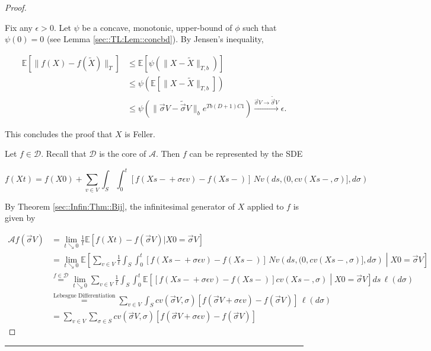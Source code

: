 \documentclass[12pt]{article}
\newcommand{\mb}{\mathbb}
\newcommand{\mc}{\mathcal}
\newcommand{\ra}{\rightarrow}
\newcommand{\os}{\overset}
\newcommand{\te}{\text}
\newcommand{\ep}{\epsilon}
\newcommand{\ind}{\hspace{24pt}}
\newcommand{\lin}{\rule{\linewidth}{0.4 pt}}
\newcommand{\ex}[1]{\mb{E}\left[#1\right]}			%
\renewcommand{\v}{v}							%
\renewcommand{\S}{S}							%
\newcommand{\s}{\sigma}							%
\newcommand{\sv}{\vec{\s}}						%
\renewcommand{\b}{b}							%
\newcommand{\ev}{\ep}							%
\newcommand{\T}{T}								%
\renewcommand{\t}{t}							%
\renewcommand{\tt}{s}							%
\newcommand{\X}{X}								%
\newcommand{\IG}{\mc{A}}						%
\newcommand{\IGr}{c}							%
\newcommand{\const}{C}							%
\newcommand{\degr}{D}							%
\newcommand{\core}{\mc{D}}						%
\newcommand{\poiss}{N}							%
\newcommand{\Sm}{\ell}							%
\newcommand{\alt}[1]{\widetilde{#1}}			%
\begin{document}
\begin{proof}
\begin{enumerate}[(a)]
\ind Fix any \(\ep > 0\). Let \(\psi\) be a concave, monotonic, upper-bound of \(\phi\) such that \(\psi(0) = 0\) (see Lemma \ref{sec::TL:Lem::concbd}). By Jensen's inequality,

\begin{align*}
\ex{\|f(\X{}{}) - f(\alt{\X}{}{})\|_\T} &\leq \ex{\psi\left(\|\X{}{} - \alt{\X}{}{}\|_{\T,\b{}}\right)}\\
&\leq \psi\left(\ex{\|\X{}{} - \alt{\X}{}{}\|_{\T,\b{}}}\right)\\
&\leq \psi\left(\|\sv{}{V} - \alt{\sv}{}{V}\|_{\b{}}e^{\T\b{}(\degr+1)\const{1}}\right) \os{\sv{}{V} \ra\alt{\sv}{}{V}}{\ra} \ep.
\end{align*}

This concludes the proof that \(\X{}{}\) is Feller.
\end{enumerate}

Let \(f \in \core\). Recall that \(\core\) is the core of \(\IG\). Then \(f\) can be represented by the SDE

\[f(\X{}{\t}) = f(\X{}{0}) + \sum_{\v \in V} \int_\S\int_0^\t [f(\X{}{\tt-} + \s\ev{\v}) - f(\X{}{\tt-})]\,\poiss{\v}\left(d\tt,(0,\IGr{\v}(\X{}{\tt-},\s)],d\s\right)\]


By Theorem \ref{sec::Infin:Thm::Bij}, the infinitesimal generator of \(\X{}{}\) applied to \(f\) is given by 

\begin{align*}
\IG f(\sv{}{V}) &= \lim_{\t \searrow 0} \frac{1}{\t} \ex{f(\X{}{\t}) - f(\sv{}{V})|\X{}{0} = \sv{}{V}}\\
&= \lim_{\t \searrow 0} \ex{\sum_{\v \in V} \frac{1}{\t}\int_\S\int_0^\t \left[f(\X{}{\tt-} + \s\ev{\v}) - f(\X{}{\tt-})\right]\,\poiss{\v}\left(d\tt,(0,\IGr{\v}(\X{}{\tt-},\s)],d\s\right)\middle|\X{}{0} = \sv{}{V}}\\
&\os{f \in \mc{D}}{=} \lim_{\t \searrow 0}\sum_{\v \in V} \frac{1}{\t}\int_\S\int_0^\t \ex{\left[f(\X{}{\tt-} + \s\ev{\v}) - f(\X{}{\tt-})\right]\IGr{\v}(\X{}{\tt-},\s)\middle|\X{}{0} = \sv{}{V}}d\tt\,\Sm(d\s)\\
&\os{\te{Lebesgue Differentiation}}{=} \sum_{\v \in V} \int_\S \IGr{\v}(\sv{}{V},\s)[f(\sv{}{V} + \s\ev{\v}) - f(\sv{}{V})]\,\Sm(d\s)\\
&= \sum_{\v \in V} \sum_{\s \in \S} \IGr{\v}(\sv{}{V},\s)[f(\sv{}{V} + \s\ev{\v}) - f(\sv{}{V})]
\end{align*}
\end{proof}

\lin
\end{document}
